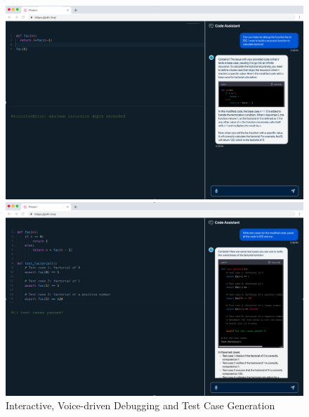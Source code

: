 



\begin{figure}[t]
\centering
\begin{minipage}{.48\textwidth}
\centering
\includegraphics[width=.98\textwidth]{p4h-5}
\end{minipage}
\begin{minipage}{.48\textwidth}
\centering
\includegraphics[width=.98\textwidth]{p4h-6}
\end{minipage}  
\caption{Interactive, Voice-driven Debugging and Test Case Generation}
\label{thrust3-three}
\end{figure}

